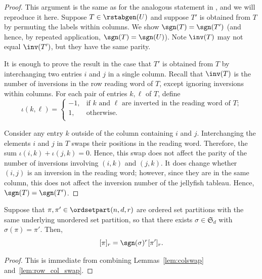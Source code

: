 \begin{proof} 
This argument is the same as for the analogous statement in \cite[Lemma~3.9]{Patrias.Pechenik.Striker}, and we will reproduce it here.
Suppose $T\in \rstabgen(U)$ and suppose $T'$ is obtained from $T$ by permuting the labels within columns.
We show $\sgn(T)=\sgn(T')$ (and hence, by repeated application, $\sgn(T) = \sgn(U)$). Note $\inv(T)$ may not equal $\inv(T')$, but they have the same parity.

It is enough to prove the result in the case that $T'$ is obtained from $T$ by interchanging two entries $i$ and $j$ in a single column.
Recall that $\inv(T)$ is the number of inversions in the row reading word of $T$, except ignoring inversions within columns. For each pair of entries $k,\ell$ of $T$, define
\[
\iota(k,\ell) = \begin{cases}
-1, & \text{if $k$ and $\ell$ are inverted in the reading word of $T$;} \\
1, & \text{otherwise.}\\
\end{cases}
\]

Consider any entry $k$ outside of the column containing $i$ and $j$.
Interchanging the elements $i$ and $j$ in $T$ swaps their
positions in the reading word. Therefore, the sum $\iota(i,k) + \iota(j,k) = 0$. Hence, this swap does not affect the parity of the number of inversions involving $(i, k)$ and $(j, k)$.
It does change whether $(i, j)$ is an inversion in the reading word; however, since they are in the same column, this does not affect the inversion number of the jellyfish tableau. Hence, $\sgn(T) = \sgn(T')$.
\end{proof}

\begin{corollary}
    Suppose that $\pi, \pi' \in \ordsetpart(n,d,r)$ are ordered set partitions with the same underlying unordered set partition, so that there exists $\sigma\in\mathfrak{S}_d$ with $\sigma(\pi)=\pi'$. Then, 
    \[
    [\pi]_r = \sgn(\sigma)^r [\pi']_r.
    \]
\end{corollary}
\begin{proof}
    This is immediate from combining Lemmas~\ref{lem:colswap} and~\ref{lem:row_col_swap}.
\end{proof}



